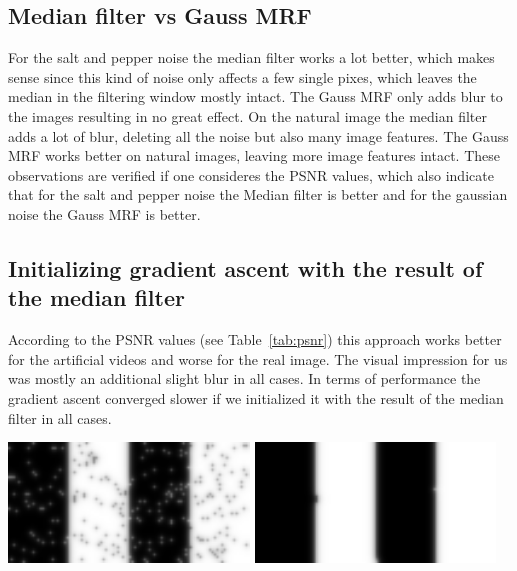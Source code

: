 \documentclass[a4paper,11pt, final]{scrartcl}
\begin{document}
\subsection*{Median filter vs Gauss MRF}
For the salt and pepper noise the median filter works a lot better, which makes sense since this kind of noise only affects a few single pixes, which leaves the median in the filtering window mostly intact. The Gauss MRF only adds blur to the images resulting in no great effect. On the natural image the median filter adds a lot of blur, deleting all the noise but also many image features. The Gauss MRF works better on natural images, leaving more image features intact. These observations are verified if one consideres the PSNR values, which also indicate that for the salt and pepper noise the Median filter is better and for the gaussian noise the Gauss MRF is better.

\subsection*{Initializing gradient ascent with the result of the median filter}
According to the PSNR values (see Table~\ref{tab:psnr}) this approach works better for the artificial videos and worse for the real image. The visual impression for us was mostly an additional slight blur in all cases. In terms of performance the gradient ascent converged slower if we initialized it with the result of the median filter in all cases.

\vspace{1cm}
{
\centering 
\includegraphics[width=0.48\textwidth]{ex3_stripes_mrf_gaussian_filter.png}
\hfill
\includegraphics[width=0.48\textwidth]{ex3_stripes_median_into_mrf_gaussian_filter.png}
}
\end{document}
